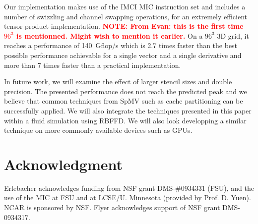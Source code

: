 \documentclass{sig-alternate}
\def\red#1{\textbf{\textcolor{red}{#1}}}
\def\NOTE#1{{\red{NOTE: #1}}}
\begin{document}
Our implementation makes use of the IMCI MIC instruction set and
includes a number of swizzling and channel swapping operations, for an
extremely efficient tensor product implementation. \NOTE{From Evan: this is the first time $96^3$ is mentionned. Might wish to mention it earlier.} On a $96^3$ 3D
grid, it reaches a performance of 140~Gflop/s which is 2.7 times
faster than the best possible performance achievable for a single
vector and a single derivative and more than 7 times faster than a
practical implementation.

In future work, we will examine the effect of larger stencil sizes and
double precision. The presented performance does not reach the
predicted peak and we believe that common techniques from SpMV such as
cache partitioning can be successfully applied. We will also integrate
the techniques presented in this paper within a fluid simulation using
RBFFD. We will also look developping a similar technique on more
commonly available devices such as GPUs.

\section*{Acknowledgment}
Erlebacher acknowledges funding from NSF grant
DMS-\#0934331 (FSU), and the use of the MIC at FSU and at LCSE/U. Minnesota (provided by Prof. D. Yuen). NCAR is sponsored by NSF. 
Flyer acknowledges support of NSF grant DMS-0934317.



\end{document}
